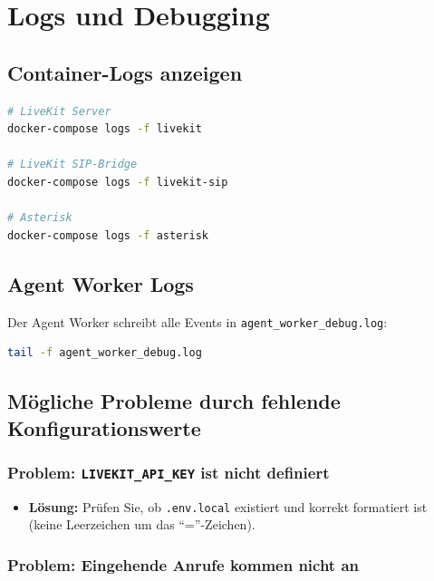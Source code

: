 \section{Logs und Debugging}
\label{sec:anhang-logs}

\subsection{Container-Logs anzeigen}

\begin{lstlisting}[language=bash,caption={Logs für einzelne Container anzeigen}]
# LiveKit Server
docker-compose logs -f livekit

# LiveKit SIP-Bridge
docker-compose logs -f livekit-sip

# Asterisk
docker-compose logs -f asterisk
\end{lstlisting}

\subsection{Agent Worker Logs}

Der Agent Worker schreibt alle Events in \texttt{agent\_worker\_debug.log}:

\begin{lstlisting}[language=bash,caption={Agent Worker Logs in Echtzeit anzeigen}]
tail -f agent_worker_debug.log
\end{lstlisting}

\subsection{Mögliche Probleme durch fehlende Konfigurationswerte}

\subsubsection{Problem: \texttt{LIVEKIT\_API\_KEY} ist nicht definiert}

\begin{itemize}
  \item \textbf{Lösung:} Prüfen Sie, ob \texttt{.env.local} existiert und korrekt formatiert ist (keine Leerzeichen um das ``=''-Zeichen).
\end{itemize}

\subsubsection{Problem: Eingehende Anrufe kommen nicht an}

